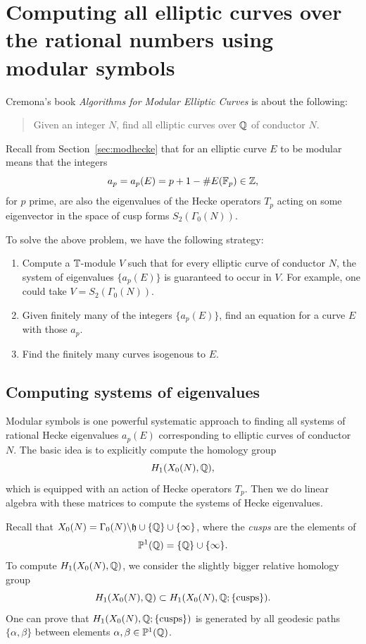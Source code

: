 \documentclass{book}
\begin{document}
\section{Computing all elliptic curves over the rational numbers using modular symbols}

Cremona's book {\em Algorithms for Modular Elliptic Curves} is about the following:

\begin{quote}
Given an integer $N$, find all elliptic curves over $\mathbb{Q}$
of conductor $N$.
\end{quote}

Recall from Section~\ref{sec:modhecke} that for an elliptic
curve $E$ to be modular means that the integers
$$
  a_p = a_p(E) = p + 1 - \#E(\mathbb{F}_p) \in \mathbb{Z},
$$
for $p$ prime, are also the eigenvalues of the
Hecke operators $T_p$ acting on some eigenvector
in the space of cusp forms $S_2(\Gamma_0(N))$.

To solve the above problem, we have the following
strategy:
\begin{enumerate}
\item Compute a $\mathbb{T}$-module $V$ such that for every
elliptic curve of conductor $N$, the system of
eigenvalues $\{a_p(E)\}$ is guaranteed to occur in $V$.
For example, one could take $V=S_2(\Gamma_0(N))$.
\item Given finitely many of the integers $\{a_p(E)\}$,
find an equation for a curve $E$ with those $a_p$.
\item Find the finitely many curves isogenous to $E$.
\end{enumerate}

\subsection{Computing systems of eigenvalues}
Modular symbols is one
powerful systematic approach to finding all systems
of rational Hecke eigenvalues $a_p(E)$ corresponding
to elliptic curves of conductor $N$.
The basic idea is to explicitly compute the homology group
$$
  H_1(X_0(N),\mathbb{Q}),
$$
which is equipped with an action of Hecke operators $T_p$.
Then we do linear algebra with these matrices
to compute the systems of Hecke eigenvalues.

Recall that $X_0(N)=\Gamma_0(N)\backslash \mathfrak{h}\cup \{\mathbb{Q}\}\cup\{\infty\}$,
where the {\em cusps} are the elements of
$$
\mathbb{P}^1(\mathbb{Q}) = \{\mathbb{Q}\}\cup\{\infty\}.
$$
To compute $H_1(X_0(N),\mathbb{Q})$, we consider the slightly
bigger relative homology group
$$
H_1(X_0(N),\mathbb{Q}) \subset H_1(X_0(N),\mathbb{Q}; \{\text{cusps}\}).
$$
One can prove that $H_1(X_0(N),\mathbb{Q}; \{\text{cusps}\})$ is
generated by all geodesic paths $\{\alpha,\beta\}$
between elements $\alpha,\beta \in \mathbb{P}^1(\mathbb{Q})$.
\end{document}
